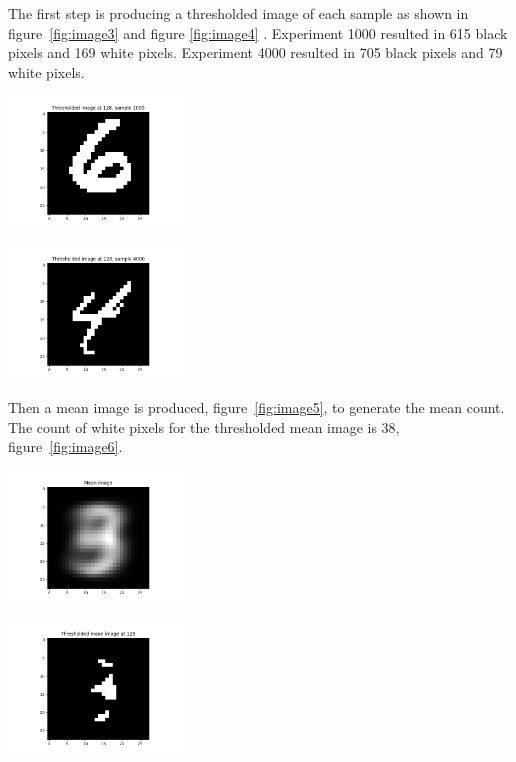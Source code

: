 The first step is producing a thresholded image of each sample as shown in figure~\ref{fig:image3} and figure \ref{fig:image4} . Experiment 1000 resulted in 615 black pixels and 169 white pixels. Experiment 4000 resulted in 705 black pixels and 79 white pixels.

\begin{center}
\includegraphics[width=0.35\textwidth]{image3.png}
\end{center}

\begin{center}
\includegraphics[width=0.35\textwidth]{image4.png}
\end{center}

Then a mean image is produced, figure~\ref{fig:image5}, to generate the mean count.
The count of white pixels for the thresholded mean image is 38, figure~\ref{fig:image6}.

\begin{center}
\includegraphics[width=0.35\textwidth]{image5.png}
\end{center}


\begin{center}
\includegraphics[width=0.35\textwidth]{image6.png}
\end{center}

